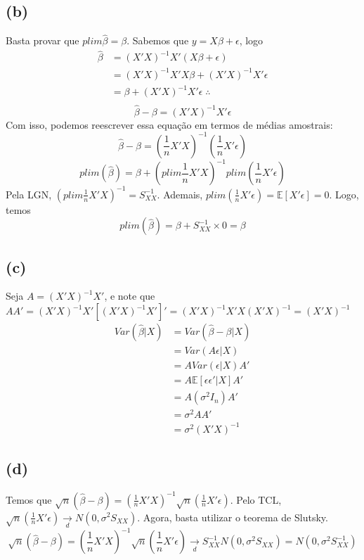 \documentclass[12pt]{article}
\begin{document}
\subsection*{(b)}
Basta provar que $plim \hat{\beta}=\beta$. Sabemos que $y=X\beta+\epsilon$, logo
\begin{align*}
\hat{\beta}&=(X'X)^{-1}X'(X\beta+\epsilon)\\
&=(X'X)^{-1}X'X\beta+(X'X)^{-1}X'\epsilon\\
&=\beta+(X'X)^{-1}X'\epsilon \; \therefore \;\\
\end{align*}
\begin{equation*}
\hat{\beta}-\beta=(X'X)^{-1}X'\epsilon
\end{equation*}
Com isso, podemos reescrever essa equação em termos de médias amostrais:
\begin{equation*}
\hat{\beta}-\beta=\left(\frac{1}{n}X'X\right)^{-1}
\left(\frac{1}{n}X'\epsilon\right)
\end{equation*}
\begin{equation*}
plim(\hat{\beta})=\beta+\left(plim\frac{1}{n}X'X\right)^{-1}
plim\left(\frac{1}{n}X'\epsilon\right)
\end{equation*}
Pela LGN, $\left(plim\frac{1}{n}X'X\right)^{-1}=S_{XX}^{-1}$. Ademais, $
plim\left(\frac{1}{n}X'\epsilon\right)=\mathbb{E}[X'\epsilon]=0$. Logo, temos
\begin{equation*}
plim(\hat{\beta})=\beta+S_{XX}^{-1}\times0=\beta
\end{equation*}

\subsection*{(c)}
Seja $A=(X'X)^{-1}X'$, e note que $AA'=(X'X)^{-1}X'[(X'X)^{-1}X']'
=(X'X)^{-1}X'X(X'X)^{-1}=(X'X)^{-1}$ 
\begin{align*}
Var(\hat{\beta}|X)&=Var(\hat{\beta}-\beta|X)\\
&=Var(A\epsilon|X)\\
&=AVar(\epsilon|X)A'\\
&=A\mathbb{E}[\epsilon\epsilon'|X]A'\\
&=A(\sigma^2I_{n})A'\\
&=\sigma^2AA'\\
&=\sigma^2(X'X)^{-1}
\end{align*}

\subsection*{(d)}
Temos que $\sqrt{n}(\hat{\beta}-\beta)=\left(\frac{1}{n}X'X\right)^{-1}
\sqrt{n}\left(\frac{1}{n}X'\epsilon\right)$. Pelo TCL, $\sqrt{n}\left(\frac{1}{n}X'\epsilon\right) \xrightarrow[d]{}N(0,\sigma^2 S_{XX})$. Agora, basta utilizar o teorema de Slutsky.
\begin{equation*}
\sqrt{n}(\hat{\beta}-\beta)=\left(\frac{1}{n}X'X\right)^{-1}
\sqrt{n}\left(\frac{1}{n}X'\epsilon\right) \xrightarrow[d]{} 
S_{XX}^{-1}N(0,\sigma^2 S_{XX})=N(0,\sigma^2 S_{XX}^{-1})
\end{equation*}
\end{document}
